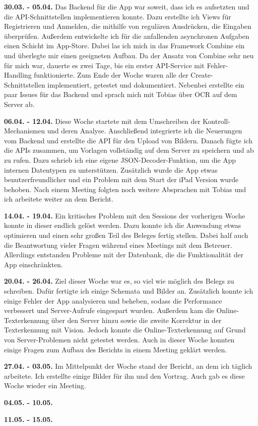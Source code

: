 \documentclass[notables, nomenclature, oneside, 150]{HSMW-Thesis}
\begin{document}
	\textbf{30.03. - 05.04.} 
	Das Backend für die App war soweit, dass ich es aufsetzten und die API-Schnittstellen implementieren konnte. Dazu erstellte ich Views für Registrieren und Anmelden, die mithilfe von regulären Ausdrücken, die Eingaben überprüfen. Außerdem entwickelte ich für die anfallenden asynchronen Aufgaben einen Schicht im App-Store. Dabei las ich mich in das Framework Combine ein und überlegte mir einen geeigneten Aufbau. Da der Ansatz von Combine sehr neu für mich war, dauerte es zwei Tage, bis ein erster API-Service mit Fehler-Handling funktionierte. Zum Ende der Woche waren alle der Create-Schnittstellen implementiert, getestet und dokumentiert. Nebenbei erstellte ein paar Issues für das Backend und sprach mich mit Tobias über OCR auf dem Server ab.
	
	\textbf{06.04. - 12.04.}
	Diese Woche startete mit dem Umschreiben der Kontroll-Mechanismen und deren Analyse. Anschließend integrierte ich die Neuerungen vom Backend und erstellte die API für den Upload von Bildern. Danach fügte ich die APIs zusammen, um Vorlagen vollständig auf dem Server zu speichern und ab zu rufen. Dazu schrieb ich eine eigene JSON-Decoder-Funktion, um die App internen Datentypen zu unterstützen. Zusätzlich wurde die App etwas benutzerfreundlicher und ein Problem mit dem Start der iPad Version wurde behoben. Nach einem Meeting folgten noch weitere Absprachen mit Tobias und ich arbeitete weiter an dem Bericht.
	
	\textbf{14.04. - 19.04.}
	Ein kritisches Problem mit den Sessions der vorherigen Woche konnte in dieser endlich gelöst werden. Dazu konnte ich die Anwendung etwas optimieren und einen sehr großen Teil des Beleges fertig stellen. Dabei half auch die Beantwortung vieler Fragen während eines Meetings mit dem Betreuer. Allerdings entstanden Probleme mit der Datenbank, die die Funktionalität der App einschränkten.
	
	\textbf{20.04. - 26.04.}
	Ziel dieser Woche war es, so viel wie möglich des Belegs zu schreiben. Dafür fertigte ich einige Schemata und Bilder an. Zusätzlich konnte ich einige Fehler der App analysieren und beheben, sodass die Performance verbessert und Server-Aufrufe eingespart wurden. Außerdem kam die Online-Texterkennung über den Server hinzu sowie die zweite Korrektur in der Texterkennung mit Vision. Jedoch konnte die Online-Texterkennung auf Grund von Server-Problemen nicht getestet werden. Auch in dieser Woche konnten einige Fragen zum Aufbau des Berichts in einem Meeting geklärt werden. 
	
	\textbf{27.04. - 03.05.}
	Im Mittelpunkt der Woche stand der Bericht, an dem ich täglich arbeitete. Ich erstellte einige Bilder für ihn und den Vortrag. Auch gab es diese Woche wieder ein Meeting.
	
	\textbf{04.05. - 10.05.}
	
	\textbf{11.05. - 15.05.}




\end{document}
